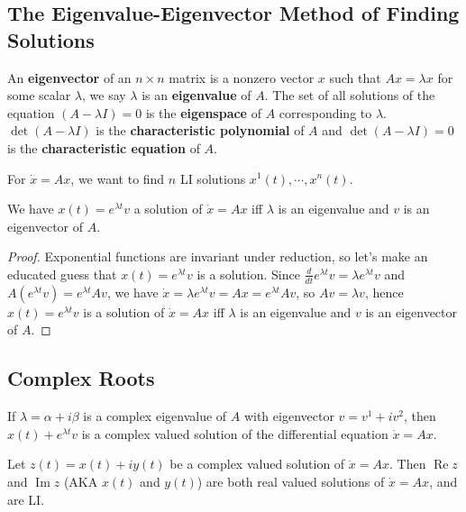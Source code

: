 \subsection{The Eigenvalue-Eigenvector Method of Finding Solutions}
\begin{definition}[Eigenblah]
    An \textbf{eigenvector} of an $n\times n$ matrix is a nonzero vector $x$ such that $Ax=\lambda x$ for some scalar $\lambda$, we say $\lambda$ is an \textbf{eigenvalue} of $A$. The set of all solutions of the equation $(A-\lambda I)=0$ is the \textbf{eigenspace} of $A$ corresponding to $\lambda$. $\det (A-\lambda I)$ is the \textbf{characteristic polynomial} of $A$ and $\det (A-\lambda I)=0$ is the \textbf{characteristic equation} of $A$.
\end{definition}
For $\dot x=Ax$, we want to find $n$ LI solutions $x^1(t),\cdots ,x^n (t)$. 
\begin{theorem}\label{eigen}
    We have $x(t)=e^{\lambda t}v$ a solution of $\dot x=Ax$ iff $\lambda$ is an eigenvalue and $v$ is an eigenvector of $A$.
\end{theorem}
\begin{proof}
    Exponential functions are invariant under reduction, so let's make an educated guess that $x(t)=e^{\lambda t}v$ is a solution. Since $\frac{d}{dt}e^{\lambda t}v=\lambda e^{\lambda t}v$ and $A(e^{\lambda t}v)=e^{\lambda t}Av$, we have $\dot x=\lambda e^{\lambda t}v=Ax=e^{\lambda t}Av$, so $Av=\lambda v$, hence $x(t)=e^{\lambda t}v$ is a solution of $\dot x=Ax$ iff $\lambda$ is an eigenvalue and $v$ is an eigenvector of $A$.
\end{proof}

\subsection{Complex Roots}
If $\lambda=\alpha +i\beta $ is a complex eigenvalue of $A$ with eigenvector $v=v^1+iv^2$, then $x(t)+e^{\lambda t}v$ is a complex valued solution of the differential equation $\dot x=Ax$.
\begin{lemma}\label{complex}
    Let $z(t)=x(t)+iy(t)$ be a complex valued solution of $\dot x=Ax$. Then $\operatorname{Re}z$ and $\operatorname{Im}z$ (AKA $x(t)$ and $y(t)$) are both real valued solutions of $\dot x=Ax$, and are LI.
\end{lemma}

